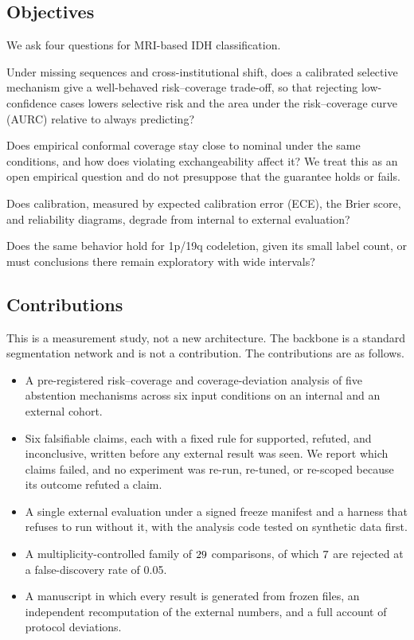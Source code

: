 \documentclass[journal]{IEEEtran}
\begin{document}
\subsection{Objectives}
We ask four questions for MRI-based IDH classification.
\begin{description}[leftmargin=1.2em,style=nextline]
\item[RQ1 (primary)] Under missing sequences and cross-institutional shift, does a calibrated selective mechanism give a well-behaved risk--coverage trade-off, so that rejecting low-confidence cases lowers selective risk and the area under the risk--coverage curve (AURC) relative to always predicting?
\item[RQ2 (primary)] Does empirical conformal coverage stay close to nominal under the same conditions, and how does violating exchangeability affect it? We treat this as an open empirical question and do not presuppose that the guarantee holds or fails.
\item[RQ3 (secondary)] Does calibration, measured by expected calibration error (ECE), the Brier score, and reliability diagrams, degrade from internal to external evaluation?
\item[RQ4 (exploratory)] Does the same behavior hold for 1p/19q codeletion, given its small label count, or must conclusions there remain exploratory with wide intervals?
\end{description}

\subsection{Contributions}
This is a measurement study, not a new architecture. The backbone is a standard segmentation network and is not a contribution. The contributions are as follows.
\begin{itemize}[leftmargin=1.2em]
\item A pre-registered risk--coverage and coverage-deviation analysis of five abstention mechanisms across six input conditions on an internal and an external cohort.
\item Six falsifiable claims, each with a fixed rule for supported, refuted, and inconclusive, written before any external result was seen. We report which claims failed, and no experiment was re-run, re-tuned, or re-scoped because its outcome refuted a claim.
\item A single external evaluation under a signed freeze manifest and a harness that refuses to run without it, with the analysis code tested on synthetic data first.
\item A multiplicity-controlled family of $29$ comparisons, of which $7$ are rejected at a false-discovery rate of 0.05.
\item A manuscript in which every result is generated from frozen files, an independent recomputation of the external numbers, and a full account of protocol deviations.
\end{itemize}
\end{document}

